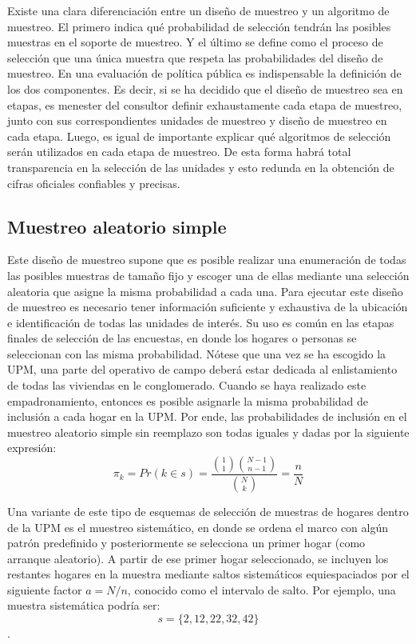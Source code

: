 \documentclass[
  12pt,
  spanish,
]{book}
\begin{document}
Existe una clara diferenciación entre un diseño de muestreo y un algoritmo de muestreo. El primero indica qué probabilidad de selección tendrán las posibles muestras en el soporte de muestreo. Y el último se define como el proceso de selección que una única muestra que respeta las probabilidades del diseño de muestreo. En una evaluación de política pública es indispensable la definición de los dos componentes. Es decir, si se ha decidido que el diseño de muestreo sea en etapas, es menester del consultor definir exhaustamente cada etapa de muestreo, junto con sus correspondientes unidades de muestreo y diseño de muestreo en cada etapa. Luego, es igual de importante explicar qué algoritmos de selección serán utilizados en cada etapa de muestreo. De esta forma habrá total transparencia en la selección de las unidades y esto redunda en la obtención de cifras oficiales confiables y precisas.

\hypertarget{muestreo-aleatorio-simple}{%
\subsection*{Muestreo aleatorio simple}\label{muestreo-aleatorio-simple}}

Este diseño de muestreo supone que es posible realizar una enumeración de todas las posibles muestras de tamaño fijo y escoger una de ellas mediante una selección aleatoria que asigne la misma probabilidad a cada una. Para ejecutar este diseño de muestreo es necesario tener información suficiente y exhaustiva de la ubicación e identificación de todas las unidades de interés. Su uso es común en las etapas finales de selección de las encuestas, en donde los hogares o personas se seleccionan con las misma probabilidad. Nótese que una vez se ha escogido la UPM, una parte del operativo de campo deberá estar dedicada al enlistamiento de todas las viviendas en le conglomerado. Cuando se haya realizado este empadronamiento, entonces es posible asignarle la misma probabilidad de inclusión a cada hogar en la UPM. Por ende, las probabilidades de inclusión en el muestreo aleatorio simple sin reemplazo son todas iguales y dadas por la siguiente expresión:
\[\pi_k = Pr(k \in s) =  \frac{\binom{1}{1}\binom{N-1}{n-1}}{\binom{N}{k}} = \frac{n}{N}\]

Una variante de este tipo de esquemas de selección de muestras de hogares dentro de la UPM es el muestreo sistemático, en donde se ordena el marco con algún patrón predefinido y posteriormente se selecciona un primer hogar (como arranque aleatorio). A partir de ese primer hogar seleccionado, se incluyen los restantes hogares en la muestra mediante saltos sistemáticos equiespaciados por el siguiente factor \(a = N/n\), conocido como el intervalo de salto. Por ejemplo, una muestra sistemática podría ser:
\[s=\{2, 12, 22, 32, 42\}\].
\end{document}
